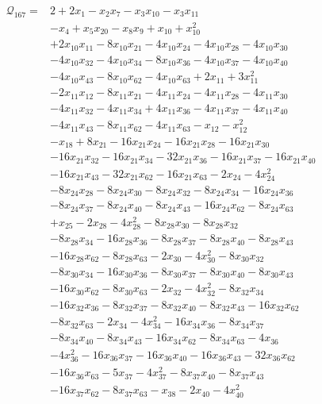 \begin{align*}
\mathcal{Q}_{167}={}&2+2x_{1}-x_{2}x_{7}-x_{3}x_{10}-x_{3}x_{11}\\
&-x_{4}+x_{5}x_{20}-x_{8}x_{9}+x_{10}+x_{10}^{2}\\
&+2x_{10}x_{11}-8x_{10}x_{21}-4x_{10}x_{24}-4x_{10}x_{28}-4x_{10}x_{30}\\
&-4x_{10}x_{32}-4x_{10}x_{34}-8x_{10}x_{36}-4x_{10}x_{37}-4x_{10}x_{40}\\
&-4x_{10}x_{43}-8x_{10}x_{62}-4x_{10}x_{63}+2x_{11}+3x_{11}^{2}\\
&-2x_{11}x_{12}-8x_{11}x_{21}-4x_{11}x_{24}-4x_{11}x_{28}-4x_{11}x_{30}\\
&-4x_{11}x_{32}-4x_{11}x_{34}+4x_{11}x_{36}-4x_{11}x_{37}-4x_{11}x_{40}\\
&-4x_{11}x_{43}-8x_{11}x_{62}-4x_{11}x_{63}-x_{12}-x_{12}^{2}\\
&-x_{18}+8x_{21}-16x_{21}x_{24}-16x_{21}x_{28}-16x_{21}x_{30}\\
&-16x_{21}x_{32}-16x_{21}x_{34}-32x_{21}x_{36}-16x_{21}x_{37}-16x_{21}x_{40}\\
&-16x_{21}x_{43}-32x_{21}x_{62}-16x_{21}x_{63}-2x_{24}-4x_{24}^{2}\\
&-8x_{24}x_{28}-8x_{24}x_{30}-8x_{24}x_{32}-8x_{24}x_{34}-16x_{24}x_{36}\\
&-8x_{24}x_{37}-8x_{24}x_{40}-8x_{24}x_{43}-16x_{24}x_{62}-8x_{24}x_{63}\\
&+x_{25}-2x_{28}-4x_{28}^{2}-8x_{28}x_{30}-8x_{28}x_{32}\\
&-8x_{28}x_{34}-16x_{28}x_{36}-8x_{28}x_{37}-8x_{28}x_{40}-8x_{28}x_{43}\\
&-16x_{28}x_{62}-8x_{28}x_{63}-2x_{30}-4x_{30}^{2}-8x_{30}x_{32}\\
&-8x_{30}x_{34}-16x_{30}x_{36}-8x_{30}x_{37}-8x_{30}x_{40}-8x_{30}x_{43}\\
&-16x_{30}x_{62}-8x_{30}x_{63}-2x_{32}-4x_{32}^{2}-8x_{32}x_{34}\\
&-16x_{32}x_{36}-8x_{32}x_{37}-8x_{32}x_{40}-8x_{32}x_{43}-16x_{32}x_{62}\\
&-8x_{32}x_{63}-2x_{34}-4x_{34}^{2}-16x_{34}x_{36}-8x_{34}x_{37}\\
&-8x_{34}x_{40}-8x_{34}x_{43}-16x_{34}x_{62}-8x_{34}x_{63}-4x_{36}\\
&-4x_{36}^{2}-16x_{36}x_{37}-16x_{36}x_{40}-16x_{36}x_{43}-32x_{36}x_{62}\\
&-16x_{36}x_{63}-5x_{37}-4x_{37}^{2}-8x_{37}x_{40}-8x_{37}x_{43}\\
&-16x_{37}x_{62}-8x_{37}x_{63}-x_{38}-2x_{40}-4x_{40}^{2}\\

\end{align*}
